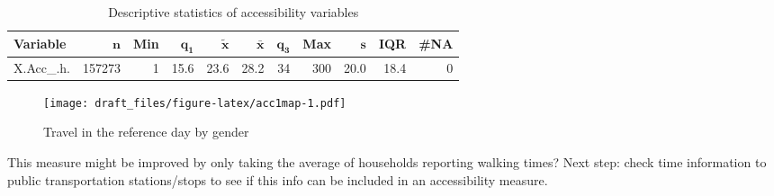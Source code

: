 \documentclass[]{article}
\begin{document}
\begin{table}[ht]
\centering
{\footnotesize
\begin{tabular}{lrrrrrrrrrr}
 \textbf{Variable} & $\mathbf{n}$ & \textbf{Min} & $\mathbf{q_1}$ & $\mathbf{\widetilde{x}}$ & $\mathbf{\bar{x}}$ & $\mathbf{q_3}$ & \textbf{Max} & $\mathbf{s}$ & \textbf{IQR} & \textbf{\#NA} \\ 
  \hline
X.Acc\_.h. & 157273 & 1 & 15.6 & 23.6 & 28.2 & 34 & 300 & 20.0 & 18.4 & 0 \\ 
  \end{tabular}
}
\caption{Descriptive statistics of accessibility variables} 
\label{tab: accvars}
\end{table}


\begin{figure}[htbp]
\centering
\texttt{[image: draft\_files/figure-latex/acc1map-1.pdf]}
\caption{Travel in the reference day by gender}
\label{Fig: acc1map}
\end{figure}

This measure might be improved by only taking the average of households
reporting walking times? Next step: check time information to public
transportation stations/stops to see if this info can be included in an
accessibility measure.

\newpage 
 
\end{document}
